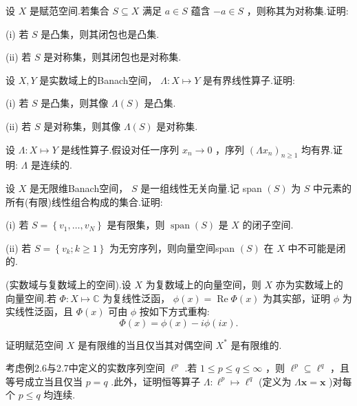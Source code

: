 \begin{rbhw}
设 $X$ 是赋范空间.若集合 $S \subseteq  X$ 满足 $a \in  S$ 蕴含 $- a \in  S$ ，则称其为对称集.证明:

(i) 若 $S$ 是凸集，则其闭包也是凸集.

(ii) 若 $S$ 是对称集，则其闭包也是对称集.
\end{rbhw}

\begin{rbhw}
设 $X,Y$ 是实数域上的Banach空间， $\Lambda  : X \mapsto  Y$ 是有界线性算子.证明:

(i) 若 $S$ 是凸集，则其像 $\Lambda \left( S\right)$ 是凸集.

(ii) 若 $S$ 是对称集，则其像 $\Lambda \left( S\right)$ 是对称集.
\end{rbhw}

\begin{rbhw}
设 $\Lambda  : X \mapsto  Y$ 是线性算子.假设对任一序列 ${x}_{n} \rightarrow  0$ ，序列 ${\left( \Lambda {x}_{n}\right) }_{n \geq  1}$ 均有界.证明: $\Lambda$ 是连续的.
\end{rbhw}

\begin{rbhw}
设 $X$ 是无限维Banach空间， $S$ 是一组线性无关向量.记 span $\left( S\right)$ 为 $S$ 中元素的所有(有限)线性组合构成的集合.证明:

(i) 若 $S = \left\{  {{v}_{1},\ldots ,{v}_{N}}\right\}$ 是有限集，则 $\operatorname{span}\left( S\right)$ 是 $X$ 的闭子空间.

(ii) 若 $S = \left\{  {{v}_{k};k \geq  1}\right\}$ 为无穷序列，则向量空间span $\left( S\right)$ 在 $X$ 中不可能是闭的.
\end{rbhw}

\begin{rbhw}
(实数域与复数域上的空间).设 $X$ 为复数域上的向量空间，则 $X$ 亦为实数域上的向量空间.若 $\Phi  : X \mapsto  \mathbb{C}$ 为复线性泛函， $\phi \left( x\right)  = \operatorname{Re}\Phi \left( x\right)$ 为其实部，证明 $\phi$ 为实线性泛函，且 $\Phi \left( x\right)$ 可由 $\phi$ 按如下方式重构:
\[
\Phi \left( x\right)  = \phi \left( x\right)  - {i\phi }\left( {ix}\right) .
\]
\end{rbhw}

\begin{rbhw}
证明赋范空间 $X$ 是有限维的当且仅当其对偶空间 ${X}^{ * }$ 是有限维的.
\end{rbhw}

\begin{rbhw}
考虑例2.6与2.7中定义的实数序列空间 ${\ell }^{p}$ .若 $1 \leq  p \leq  q \leq  \infty$ ，则 ${\ell }^{p} \subseteq  {\ell }^{q}$ ，且等号成立当且仅当 $p = q$ .此外，证明恒等算子 $\Lambda  : {\ell }^{p} \mapsto  {\ell }^{q}$ (定义为 $\Lambda \bm{x} = \bm{x}$ )对每个 $p \leq  q$ 均连续.
\end{rbhw}

